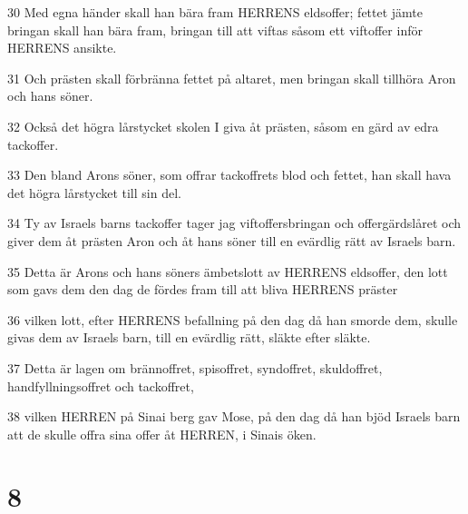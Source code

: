 \par 30 Med egna händer skall han bära fram HERRENS eldsoffer; fettet jämte bringan skall han bära fram, bringan till att viftas såsom ett viftoffer inför HERRENS ansikte.
\par 31 Och prästen skall förbränna fettet på altaret, men bringan skall tillhöra Aron och hans söner.
\par 32 Också det högra lårstycket skolen I giva åt prästen, såsom en gärd av edra tackoffer.
\par 33 Den bland Arons söner, som offrar tackoffrets blod och fettet, han skall hava det högra lårstycket till sin del.
\par 34 Ty av Israels barns tackoffer tager jag viftoffersbringan och offergärdslåret och giver dem åt prästen Aron och åt hans söner till en evärdlig rätt av Israels barn.
\par 35 Detta är Arons och hans söners ämbetslott av HERRENS eldsoffer, den lott som gavs dem den dag de fördes fram till att bliva HERRENS präster
\par 36 vilken lott, efter HERRENS befallning på den dag då han smorde dem, skulle givas dem av Israels barn, till en evärdlig rätt, släkte efter släkte.
\par 37 Detta är lagen om brännoffret, spisoffret, syndoffret, skuldoffret, handfyllningsoffret och tackoffret,
\par 38 vilken HERREN på Sinai berg gav Mose, på den dag då han bjöd Israels barn att de skulle offra sina offer åt HERREN, i Sinais öken.

\chapter{8}

